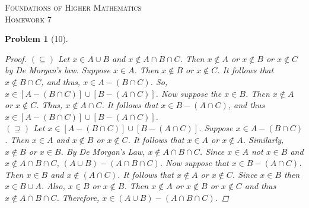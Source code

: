 \documentclass{article}
\theoremstyle{problem}
\newtheorem{prob}{Problem}
\theoremstyle{plain}
\theoremstyle{remark}
\begin{document}
\begin{center}
\textsc{\Large Foundations of Higher Mathematics}\\[.3cm]
\textsc{\Large Homework 7}
\end{center}

\begin{prob}[10]\ \\[-1cm]
  \begin{proof}
    $(\subseteq)$ Let $x \in A \cup B$ and $x \not \in A \cap B \cap C$. Then $x \not \in A$ or $x \not \in B$ or $x \not \in C$ by De Morgan's law. Suppose $x \in A$. Then $x \not \in B$ or $x \not \in C$. It follows that $x \not \in B \cap C$, and thus, $x \in A - (B \cap C)$. So, $x \in [A - (B \cap C)] \cup [B - (A \cap C)]$. Now suppose the $x \in B$. Then $x \not \in A$ or $x \not \in C$. Thus, $x \not \in A \cap C$. It follows that $x \in B - (A \cap C)$, and thus $x \in [A - (B \cap C)] \cup [B - (A \cap C)]$.\\

    $(\supseteq)$ Let $x \in [A - (B \cap C)] \cup [B - (A \cap C)]$. Suppose $x \in A - (B \cap C)$. Then $x \in A$ and $x \not \in B$ or $x \not \in C$. It follows that $x \in A$ or $x \not \in A$. Similarly, $x \not \in B$ or $x \in B$. By De Morgan's Law, $x \not \in A \cap B \cap C$. Since $x \in A$ not $x \in B$ and $x \not \in A \cap B \cap C$, $(A \cup B) - (A \cap B \cap C)$. Now suppose that $x \in B - (A \cap C)$. Then $x \in B$ and $x \not \in (A \cap C)$. It follows that $x \not \in A$ or $x \not \in C$. Since $x \in B$ then $x \in B \cup A$. Also, $x \in B$ or $x \not \in B$. Then $x \not \in A$ or $x \not \in B$ or $x \not \in C$ and thus $x \not \in A \cap B \cap C$. Therefore, $x \in (A \cup B) - (A \cap B \cap C)$.
  \end{proof}
\end{prob}
%
\end{document}
